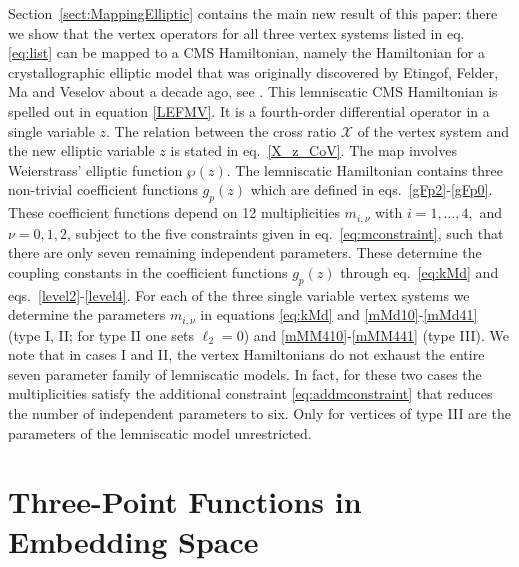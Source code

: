 \documentclass{article}
\begin{document}
Section~\ref{sect:MappingElliptic} contains the main new result of this paper: there we 
show that the vertex operators for all three vertex systems listed in eq. \eqref{eq:list} 
can be mapped to a CMS Hamiltonian, namely the Hamiltonian for a crystallographic 
elliptic model that was originally discovered by Etingof, Felder, Ma and Veselov 
about a decade ago, see \cite{etingof2011107}. This lemniscatic CMS
Hamiltonian is spelled out in equation \eqref{LEFMV}. It is a fourth-order differential
operator in a single variable $z$. The relation between the cross ratio $\mathcal{X}$
of the vertex system and the new elliptic variable $z$ is stated in eq.\ \eqref{X_z_CoV}. 
The map involves Weierstrass' elliptic function $\wp(z)$. The lemniscatic Hamiltonian 
contains three non-trivial coefficient functions $g_p(z)$ which are defined in eqs.\ 
\eqref{gFp2}-\eqref{gFp0}. These coefficient functions depend on 12 multiplicities $m_{i,\nu}$ with $i=1, \dots, 4,$ and $\nu =0,1,2$, subject to the 
five constraints given in eq.\ \eqref{eq:mconstraint}, such that there are only seven remaining independent parameters. These determine the 
coupling constants in the coefficient functions $g_p(z)$ through eq.\ \eqref{eq:kMd}
and eqs.\ \eqref{level2}-\eqref{level4}. For each of the three single variable
vertex systems we determine the parameters $m_{i,\nu}$ in equations 
\eqref{eq:kMd} and \eqref{mMd10}-\eqref{mMd41} (type I, II; for type II one sets 
$\ell_2=0$) and \eqref{mMM410}-\eqref{mMM441} (type III). We note that in 
cases I and II, the vertex Hamiltonians do not exhaust the entire seven parameter family 
of lemniscatic models. In fact, for these two cases the multiplicities satisfy the additional 
constraint \eqref{eq:addmconstraint} that reduces the number of independent parameters to 
six.  Only for vertices of type III are the parameters of the lemniscatic model unrestricted. 


\section{Three-Point Functions in Embedding Space}
\label{sect:threepointfunctions}
\end{document}
